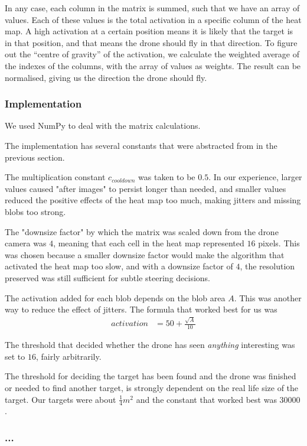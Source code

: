 \documentclass[a4paper,10pt]{article}
\begin{document}
In any case, each column in the matrix is summed, such that we have an
array of values. Each of these values is the total activation in a specific
column of the heat map. A high activation at a certain position means it is
likely that the target is in that position, and that means the drone should
fly in that direction. To figure out the ``centre of gravity'' of the
activation, we calculate the weighted average of the indexes of the columns,
with the array of values as weights. The result can be normalised, giving us
the direction the drone should fly.
\subsubsection{Implementation}
We used NumPy to deal with the matrix calculations.

The implementation has several constants that were abstracted from in the
previous section.

The multiplication constant $c_{{cooldown}}$ was taken to be
$0.5$. In our experience, larger values caused "after images" to persist
longer than needed, and smaller values reduced the positive effects of
the heat map too much, making jitters and missing blobs too strong.

The "downsize factor" by which the matrix was scaled down from the
drone camera was $4$, meaning that each cell in the heat map represented $16$
pixels. This was chosen because a smaller downsize factor would make the
algorithm that activated the heat map too slow, and with a downsize factor of
$4$, the resolution preserved was still sufficient for subtle steering
decisions.

The activation added for each blob depends on the blob area $A$. This was
another way to reduce the effect of jitters. The formula
that worked best for us was
\begin{align*}
 activation &=50 + \frac{\sqrt{A}}{10}
\end{align*}


The threshold that decided whether the drone has seen \emph{anything}
interesting was set to $16$, fairly arbitrarily.

The threshold for deciding the target has been found and the drone was
finished or needed to find another target, is strongly dependent on the
real life size of the target. Our targets were about $\frac{1}{4} m^2$
and the constant that worked best was $30 000$.

\subsubsection{...}
\end{document}
